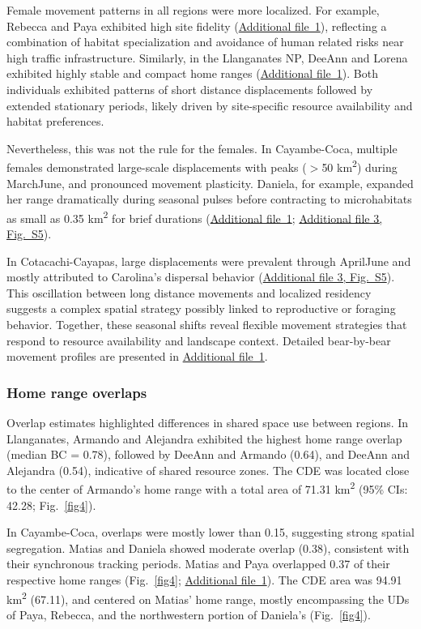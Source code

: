 \documentclass[lineno,referee,pdflatex,sn-vancouver-num]{sn-jnl}%
\theoremstyle{thmstyleone}%
\theoremstyle{thmstyletwo}%
\theoremstyle{thmstylethree}%
\begin{document}
Female movement patterns in all regions were more localized. For example, Rebecca and Paya exhibited high site fidelity (\hyperref[S1_File]{Additional file~1}), reflecting a combination of habitat specialization and avoidance of human related risks near high traffic infrastructure. Similarly, in the Llanganates NP, DeeAnn and Lorena exhibited highly stable and compact home ranges (\hyperref[S1_File]{Additional file~1}). Both individuals exhibited patterns of short distance displacements followed by extended stationary periods, likely driven by site-specific resource availability and habitat preferences.

Nevertheless, this was not the rule for the females. In Cayambe-Coca, multiple females demonstrated large-scale displacements with peaks ($>$50 km\textsuperscript{2}) during March\textendash June, and pronounced movement plasticity. Daniela, for example, expanded her range dramatically during seasonal pulses before contracting to microhabitats as small as 0.35 km\textsuperscript{2} for brief durations (\hyperref[S1_File]{Additional file~1}; \hyperref[S3_File]{Additional file 3, Fig.~S5}).

In Cotacachi-Cayapas, large displacements were prevalent through April\textendash June and mostly attributed to Carolina's dispersal behavior (\hyperref[S3_File]{Additional file 3, Fig.~S5}). This oscillation between long distance movements and localized residency suggests a complex spatial strategy possibly linked to reproductive or foraging behavior. Together, these seasonal shifts reveal flexible movement strategies that respond to resource availability and landscape context. Detailed bear-by-bear movement profiles are presented in \hyperref[S1_File]{Additional file~1}.

\subsubsection{Home range overlaps}

Overlap estimates highlighted differences in shared space use between regions. In Llanganates, Armando and Alejandra exhibited the highest home range overlap (median BC = 0.78), followed by DeeAnn and Armando (0.64), and DeeAnn and Alejandra (0.54), indicative of shared resource zones. The CDE was located close to the center of Armando's home range with a total area of 71.31 km\textsuperscript{2} (95\% CIs: 42.28; Fig.~\ref{fig4}).

In Cayambe-Coca, overlaps were mostly lower than 0.15, suggesting strong spatial segregation. Matias and Daniela showed moderate overlap (0.38), consistent with their synchronous tracking periods. Matias and Paya overlapped 0.37 of their respective home ranges (Fig.~\ref{fig4}; \hyperref[S1_File]{Additional file~1}). The CDE area was 94.91 km\textsuperscript{2} (67.11), and centered on Matias' home range, mostly encompassing the UDs of Paya, Rebecca, and the northwestern portion of Daniela's (Fig.~\ref{fig4}).
\end{document}
